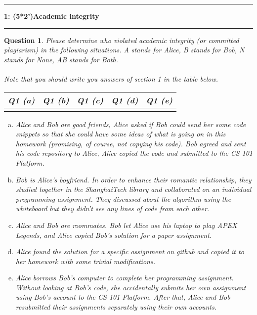 \documentclass[10.5pt]{article}
\newcommand\question[2]{\vspace{.25in}\hrule\textbf{#1: #2}\vspace{.5em}\hrule\vspace{.10in}}
\newtheorem{Q}{Question}
\begin{document}
  \question{1}{(5*2')Academic integrity}
    \begin{Q}
    Please determine who violated academic integrity (or committed plagiarism) in the following situations. A stands for Alice, B stands for Bob, N stands for None, AB stands for Both.
    \\ \\
    \textit{Note that you should write you answers of section 1 in the table below.}
\begin{table}[htbp]
	\begin{tabular}{|p{1.5cm}|p{1.5cm}|p{1.5cm}|p{1.5cm}|p{1.5cm}|}
		\hline 
		Q1 (a) & Q1 (b) & Q1 (c) & Q1 (d) & Q1 (e) \\ 
		\hline 
		&  &  &  & \\ 
		\hline 
	\end{tabular} 
\end{table}
    	\begin{enumerate}[(a)]
    		\item Alice and Bob are good friends, Alice asked if Bob could send her some code snippets so that she could have some ideas of what is going on in this homework (promising, of course, not copying his code). Bob agreed and sent his code repository to Alice, Alice copied the code and submitted to the CS 101 Platform.
    		
    		\item Bob is Alice's boyfriend. In order to enhance their romantic relationship, they studied together in the ShanghaiTech library and collaborated on an individual programming assignment. They discussed about the algorithm using the whiteboard but they didn't see any lines of code from each other.
    		    		
    		    		
    		\item Alice and Bob are roommates. Bob let Alice use his laptop to play APEX Legends, and Alice copied Bob's solution for a paper assignment.
    		
    		\item Alice found the solution for a specific assignment on github and copied it to her homework with some trivial modifications.
    		
    		\item Alice borrows Bob's computer to complete her programming assignment. Without looking at Bob's code, she accidentally submits her own assignment using Bob's account to the CS 101 Platform. After that, Alice and Bob resubmitted their assignments separately using their own accounts.
    		
    		\end{enumerate}
    \end{Q}
	
\end{document}
